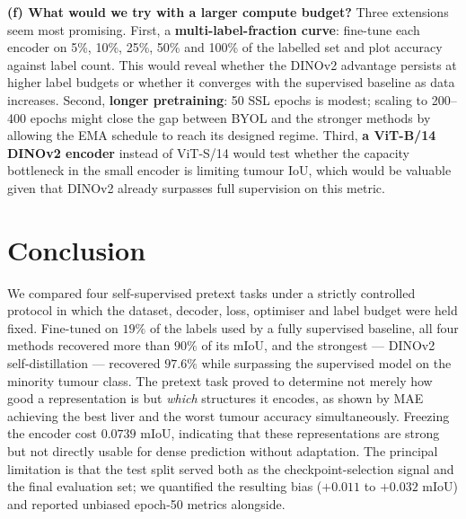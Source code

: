 \documentclass[conference]{IEEEtran}
\begin{document}
\textbf{(f) What would we try with a larger compute budget?}
Three extensions seem most promising. First, a \textbf{multi-label-fraction
curve}: fine-tune each encoder on 5\%, 10\%, 25\%, 50\% and 100\% of the
labelled set and plot accuracy against label count. This would reveal
whether the DINOv2 advantage persists at higher label budgets or whether it
converges with the supervised baseline as data increases. Second,
\textbf{longer pretraining}: 50 SSL epochs is modest; scaling to 200--400
epochs might close the gap between BYOL and the stronger methods by allowing
the EMA schedule to reach its designed regime. Third, \textbf{a ViT-B/14
DINOv2 encoder} instead of ViT-S/14 would test whether the capacity
bottleneck in the small encoder is limiting tumour IoU, which would be
valuable given that DINOv2 already surpasses full supervision on this metric.

\section{Conclusion}

We compared four self-supervised pretext tasks under a strictly controlled
protocol in which the dataset, decoder, loss, optimiser and label budget were held
fixed. Fine-tuned on $19\%$ of the labels used by a fully supervised baseline, all
four methods recovered more than $90\%$ of its mIoU, and the strongest --- DINOv2
self-distillation --- recovered $97.6\%$ while surpassing the supervised model on
the minority tumour class. The pretext task proved to determine not merely how
good a representation is but \emph{which} structures it encodes, as shown by MAE
achieving the best liver and the worst tumour accuracy simultaneously. Freezing the
encoder cost $0.0739$ mIoU, indicating that these representations are strong but
not directly usable for dense prediction without adaptation. The principal
limitation is that the test split served both as the checkpoint-selection signal
and the final evaluation set; we quantified the resulting bias
($+0.011$ to $+0.032$ mIoU) and reported unbiased epoch-50 metrics alongside.
\end{document}
